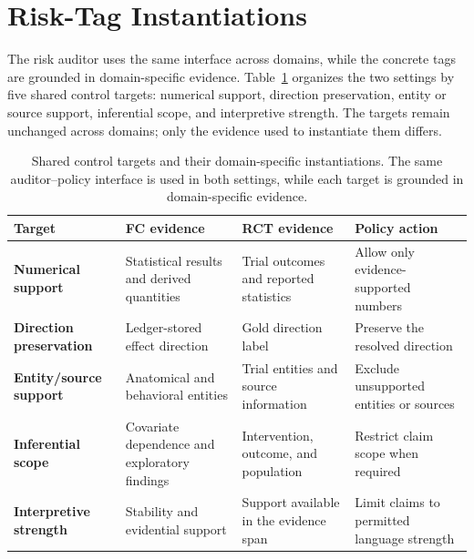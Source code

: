 \documentclass[10pt,twocolumn]{article}
\begin{document}
\section{Risk-Tag Instantiations}
\label{app:risk-tax}

The risk auditor uses the same interface across domains, while the concrete tags are grounded in domain-specific evidence. Table~\ref{tab:risk-tax-domain} organizes the two settings by five shared control targets: numerical support, direction preservation, entity or source support, inferential scope, and interpretive strength. The targets remain unchanged across domains; only the evidence used to instantiate them differs.

\begin{table}[t]
	\caption{Shared control targets and their domain-specific instantiations. The same auditor--policy interface is used in both settings, while each target is grounded in domain-specific evidence.}
	\label{tab:risk-tax-domain}
	\centering
	\footnotesize
	\setlength{\tabcolsep}{3pt}
	\renewcommand{\arraystretch}{1.10}
	
	\begin{tabular}{
			>{\centering\arraybackslash}m{}
			>{\centering\arraybackslash}m{}
			>{\centering\arraybackslash}m{}
			>{\centering\arraybackslash}m{}}
		\toprule
		\textbf{Target} &
		\textbf{FC evidence} &
		\textbf{RCT evidence} &
		\textbf{Policy action} \\
		\midrule
		
		\textbf{Numerical support}
		& Statistical results and derived quantities
		& Trial outcomes and reported statistics
		& Allow only evidence-supported numbers \\
		\midrule
		
		\textbf{Direction preservation}
		& Ledger-stored effect direction
		& Gold direction label
		& Preserve the resolved direction \\
		\midrule
		
		\textbf{Entity/source support}
		& Anatomical and behavioral entities
		& Trial entities and source information
		& Exclude unsupported entities or sources \\
		\midrule
		
		\textbf{Inferential scope}
		& Covariate dependence and exploratory findings
		& Intervention, outcome, and population
		& Restrict claim scope when required \\
		\midrule
		
		\textbf{Interpretive strength}
		& Stability and evidential support
		& Support available in the evidence span
		& Limit claims to permitted language strength \\
		\bottomrule
	\end{tabular}
\end{table}
\end{document}
